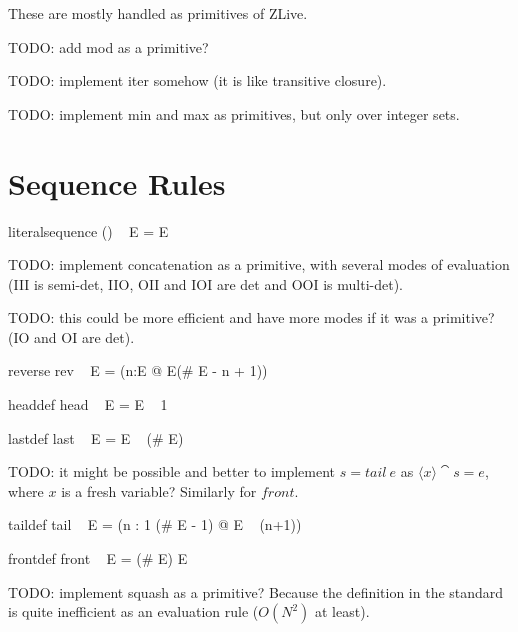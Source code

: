 \documentclass{article}
\begin{document}
These are mostly handled as primitives of ZLive.


TODO: add mod as a primitive?

TODO: implement iter somehow (it is like transitive closure).

TODO: implement min and max as primitives, but only over integer sets.


\section{Sequence Rules}

\begin{zedrule}{literalsequence}
   (\langle \listarg \rangle) ~ E = E
\end{zedrule}

TODO: implement concatenation as a primitive, with several
modes of evaluation (III is semi-det, IIO, OII and IOI are det
and OOI is multi-det).

TODO: this could be more efficient and have more modes if it
was a primitive? (IO and OI are det).
\begin{zedrule}{reverse}
   rev ~ E = (\lambda n:\dom E @ E(\# E - n + 1))
\end{zedrule}

\begin{zedrule}{headdef}
   head ~ E = E ~ 1
\end{zedrule}

\begin{zedrule}{lastdef}
   last ~ E = E ~ (\# E)
\end{zedrule}

TODO: it might be possible and better to implement $s=tail~e$
as $\langle x \rangle \cat s = e$, where $x$ is a fresh variable?
Similarly for $front$.
\begin{zedrule}{taildef}
   tail ~ E = (\lambda n : 1 \upto (\# E - 1) @ E ~ (n+1))
\end{zedrule}

\begin{zedrule}{frontdef}
   front ~ E = (\# E) \ndres E
\end{zedrule}

TODO: implement squash as a primitive?
Because the definition in the standard is quite inefficient as
an evaluation rule ($O(N^2)$ at least). 
\end{document}
